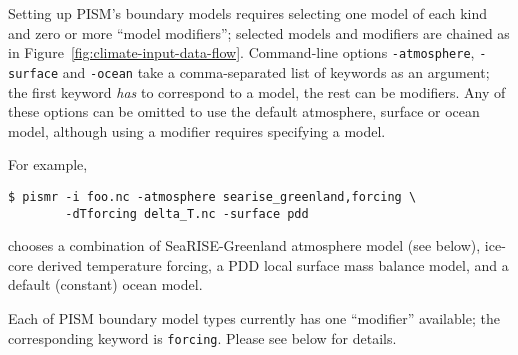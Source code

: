 Setting up PISM's boundary models requires selecting one model of each kind and zero or more ``model modifiers''; selected models and modifiers are chained as in Figure~\ref{fig:climate-input-data-flow}. Command-line options \texttt{-atmosphere}, \texttt{-surface} and \texttt{-ocean} take a comma-separated list of keywords as an argument; the first keyword \emph{has} to correspond to a model, the rest can be modifiers. Any of these options can be omitted to use the default atmosphere, surface or ocean model, although using a modifier requires specifying a model.

For example,
\begin{verbatim}
$ pismr -i foo.nc -atmosphere searise_greenland,forcing \
        -dTforcing delta_T.nc -surface pdd
\end{verbatim}%
chooses a combination of SeaRISE-Greenland atmosphere model (see below),  ice-core derived temperature forcing, a PDD local surface mass balance model, and a default (constant) ocean model.

Each of PISM boundary model types currently has one ``modifier'' available; the corresponding keyword is \texttt{forcing}. Please see below for details.

